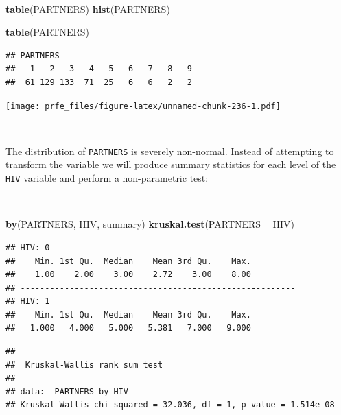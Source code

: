 \documentclass[12pt,a4paper]{book}
\newenvironment{Shaded}{\begin{snugshade}}{\end{snugshade}}
\newcommand{\KeywordTok}[1]{\textcolor[rgb]{0.13,0.29,0.53}{\textbf{#1}}}
\newcommand{\NormalTok}[1]{#1}
\newcommand{\OperatorTok}[1]{\textcolor[rgb]{0.81,0.36,0.00}{\textbf{#1}}}
\newcommand{\StringTok}[1]{\textcolor[rgb]{0.31,0.60,0.02}{#1}}
\theoremstyle{definition}
\theoremstyle{definition}
\theoremstyle{definition}
\theoremstyle{remark}
\begin{document}
~

\begin{Shaded}
\begin{Highlighting}[]
\KeywordTok{table}\NormalTok{(PARTNERS)}
\KeywordTok{hist}\NormalTok{(PARTNERS)}
\end{Highlighting}
\end{Shaded}

\begin{Shaded}
\begin{Highlighting}[]
\KeywordTok{table}\NormalTok{(PARTNERS)}
\end{Highlighting}
\end{Shaded}

\begin{verbatim}
## PARTNERS
##   1   2   3   4   5   6   7   8   9 
##  61 129 133  71  25   6   6   2   2
\end{verbatim}

\newpage

\texttt{[image: prfe\_files/figure-latex/unnamed-chunk-236-1.pdf]}

~

The distribution of \texttt{PARTNERS} is severely non-normal. Instead of
attempting to transform the variable we will produce summary statistics
for each level of the \texttt{HIV} variable and perform a non-parametric
test:

~

\begin{Shaded}
\begin{Highlighting}[]
\KeywordTok{by}\NormalTok{(PARTNERS, HIV, summary)}
\KeywordTok{kruskal.test}\NormalTok{(PARTNERS }\OperatorTok{~}\StringTok{ }\NormalTok{HIV)}
\end{Highlighting}
\end{Shaded}

\begin{verbatim}
## HIV: 0
##    Min. 1st Qu.  Median    Mean 3rd Qu.    Max. 
##    1.00    2.00    3.00    2.72    3.00    8.00 
## -------------------------------------------------------- 
## HIV: 1
##    Min. 1st Qu.  Median    Mean 3rd Qu.    Max. 
##   1.000   4.000   5.000   5.381   7.000   9.000
\end{verbatim}

\begin{verbatim}
## 
##  Kruskal-Wallis rank sum test
## 
## data:  PARTNERS by HIV
## Kruskal-Wallis chi-squared = 32.036, df = 1, p-value = 1.514e-08
\end{verbatim}
\end{document}
